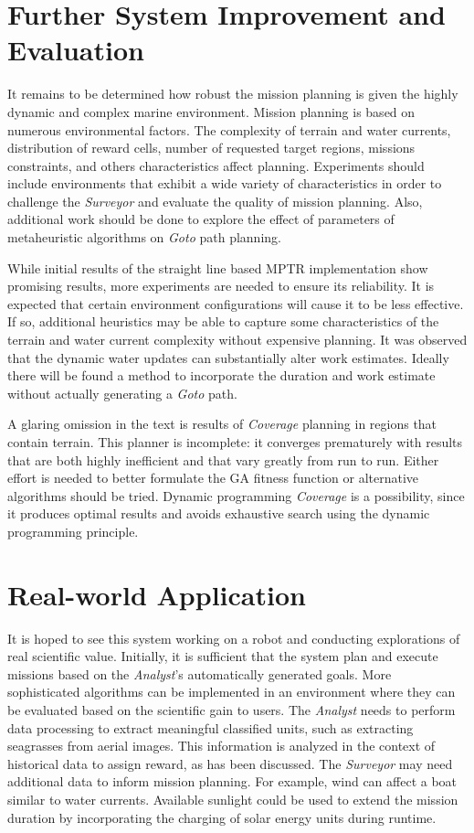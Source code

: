 \documentclass{tamuccthesis}
\begin{document}
\section{Further System Improvement and Evaluation}

It remains to be determined how robust the mission planning is given the highly dynamic and complex marine environment. Mission planning is based on numerous environmental factors. The complexity of terrain and water currents, distribution of reward cells, number of requested target regions, missions constraints, and others characteristics affect planning. Experiments should include environments that exhibit a wide variety of characteristics in order to challenge the \textit{Surveyor} and evaluate the quality of mission planning. Also, additional work should be done to explore the effect of parameters of metaheuristic algorithms on \textit{Goto} path planning.

While initial results of the straight line based MPTR implementation show promising results, more experiments are needed to ensure its reliability. It is expected that certain environment configurations will cause it to be less effective. If so, additional heuristics may be able to capture some characteristics of the terrain and water current complexity without expensive planning. It was observed that the dynamic water updates can substantially alter work estimates. Ideally there will be found a method to incorporate the duration and work estimate without actually generating a \textit{Goto} path. 

A glaring omission in the text is results of \textit{Coverage} planning in regions that contain terrain. This planner is incomplete: it converges prematurely with results that are both highly inefficient and that vary greatly from run to run. Either effort is needed to better formulate the GA fitness function or alternative algorithms should be tried. Dynamic programming \textit{Coverage} is a possibility, since it produces optimal results and avoids exhaustive search using the dynamic programming principle. 

\section{Real-world Application}

It is hoped to see this system working on a robot and conducting explorations of real scientific value. Initially, it is sufficient that the system plan and execute missions based on the \textit{Analyst}'s automatically generated goals. More sophisticated algorithms can be implemented in an environment where they can be evaluated based on the scientific gain to users. The \textit{Analyst} needs to perform data processing to extract meaningful classified units, such as extracting seagrasses from aerial images. This information is analyzed in the context of historical data to assign reward, as has been discussed. The \textit{Surveyor} may need additional data to inform mission planning. For example, wind can affect a boat similar to water currents. Available sunlight could be used to extend the mission duration by incorporating the charging of solar energy units during runtime.  
\end{document}
